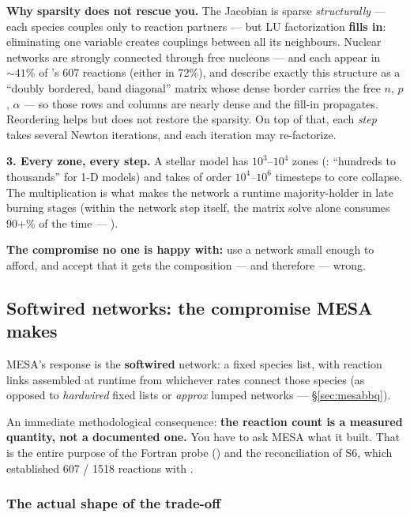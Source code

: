 \textbf{Why sparsity does not rescue you.} The Jacobian is sparse
\emph{structurally} --- each species couples only to reaction partners --- but
LU factorization \textbf{fills in}: eliminating one variable creates couplings
between all its neighbours. Nuclear networks are strongly connected through free
nucleons ---  and  each appear in ${\sim}41\%$ of
's 607 reactions (either in 72\%), and \citet{hix1999b} describe exactly
this structure as a ``doubly bordered, band diagonal'' matrix whose dense border
carries the free $n$, $p$, $\alpha$ --- so those rows and columns are nearly
dense and the fill-in propagates. Reordering helps but does not restore the
sparsity. On top of that, each \emph{step} takes several Newton iterations, and
each iteration may re-factorize.

\textbf{3. Every zone, every step.} A stellar model has $10^{3}$--$10^{4}$ zones
(\citealt{hix1999b}: ``hundreds to thousands'' for 1-D models) and takes of
order $10^{4}$--$10^{6}$ timesteps to core collapse. The multiplication is what
makes the network a runtime majority-holder in late burning stages (within the
network step itself, the matrix solve alone consumes 90$+$\% of the time ---
\citealt{hix1999b}).

\textbf{The compromise no one is happy with:} use a network small enough to
afford, and accept that it gets the composition --- and therefore \Ye{} ---
wrong.

\subsection{Softwired networks: the compromise MESA makes}
\label{sec:softwired}

MESA's response is the \textbf{softwired} network: a fixed species list, with
reaction links assembled at runtime from whichever rates connect those species
(as opposed to \emph{hardwired} fixed lists or \emph{approx} lumped networks ---
\S\ref{sec:mesabbq}).

An immediate methodological consequence: \textbf{the reaction count is a
measured quantity, not a documented one.} You have to ask MESA what it built.
That is the entire purpose of the Fortran probe
() and the reconciliation of S6, which
established 607 / 1518 reactions with .

\subsubsection{The actual shape of the trade-off}
\label{sec:networkshape}

